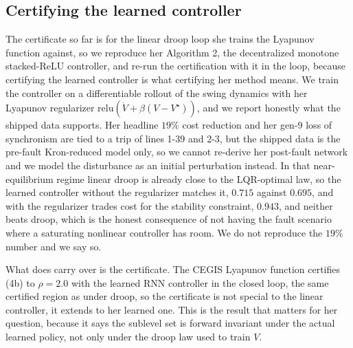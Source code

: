 \documentclass[letterpaper,journal]{IEEEtran}
\newcommand{\Lie}{\dot{V}}
\newcommand{\Vstar}{V^\star}
\begin{document}
\subsection{Certifying the learned controller}
The certificate so far is for the linear droop loop she trains the Lyapunov
function against, so we reproduce her Algorithm 2, the decentralized monotone
stacked-ReLU controller, and re-run the certification with it in the loop, because
certifying the learned controller is what certifying her method means. We train the
controller on a differentiable rollout of the swing dynamics with her Lyapunov
regularizer $\mathrm{relu}(\Lie + \beta(V-\Vstar))$, and we report honestly what
the shipped data supports. Her headline $19\%$ cost reduction and her gen-9 loss of
synchronism are tied to a trip of lines 1-39 and 2-3, but the shipped data is the
pre-fault Kron-reduced model only, so we cannot re-derive her post-fault network and
we model the disturbance as an initial perturbation instead. In that near-equilibrium
regime linear droop is already close to the LQR-optimal law, so the learned
controller without the regularizer matches it, $0.715$ against $0.695$, and with the
regularizer trades cost for the stability constraint, $0.943$, and neither beats
droop, which is the honest consequence of not having the fault scenario where a
saturating nonlinear controller has room. We do not reproduce the $19\%$ number and
we say so.

What does carry over is the certificate. The CEGIS Lyapunov function certifies (4b)
to $\rho=2.0$ with the learned RNN controller in the closed loop, the same certified
region as under droop, so the certificate is not special to the linear controller,
it extends to her learned one. This is the result that matters for her question,
because it says the sublevel set is forward invariant under the actual learned
policy, not only under the droop law used to train $V$.
\end{document}
